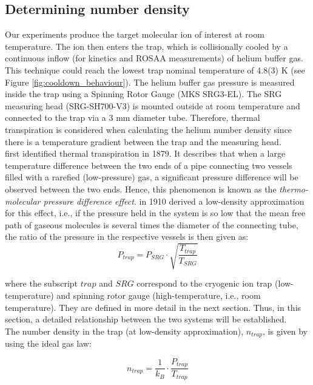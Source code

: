 \subsection{Determining number density}
\label{subsec:numer-density}

Our experiments produce the target molecular ion of interest at room
temperature. The ion then enters the trap, which is collisionally cooled by a continuous
inflow (for kinetics and ROSAA measurements) of helium buffer gas. This
technique could reach the lowest trap nominal temperature of 4.8(3) K (see
Figure \ref{fig:cooldown_behaviour}). The helium buffer gas pressure is
measured inside the trap using a Spinning Rotor Gauge (MKS SRG3-EL). The SRG
measuring head (SRG-SH700-V3) is mounted outside at room temperature and
connected to the trap via a 3 mm diameter tube. Therefore, thermal
transpiration is considered when calculating the helium number density since
there is a temperature gradient between the trap and the measuring head.\\

\citet{reynolds_xviii_1879} first identified thermal transpiration in 1879. It describes that when a large temperature difference between the two ends of a pipe connecting two vessels filled with a rarefied (low-pressure) gas, a significant pressure difference will be observed between the two ends. Hence, this phenomenon is known as the \textit{thermo-molecular pressure difference effect}. \citet{knudsen_thermischer_1910} in 1910 derived a low-density approximation for this effect, i.e., if the pressure held in the system is so low that the mean free path of gaseous molecules is several times the diameter of the connecting tube, the ratio of the pressure in the respective vessels is then given as:
\begin{equation}
    P_{trap} = P_{SRG} \cdot \sqrt{\frac{T_{trap}}{T_{SRG}}}
    \label{eqn:knudsen}
\end{equation}

where the subscript $trap$ and $SRG$ correspond to the cryogenic ion trap
(low-temperature) and spinning rotor gauge (high-temperature, i.e., room
temperature). They are defined in more detail in the next section. Thus, in
this section, a detailed relationship between the two systems will be
established.\\

The number density in the trap (at low-density approximation), $n_{trap}$, is
given by using the ideal gas law:

\begin{equation}
    n_{trap} = \frac{1}{k_B} \cdot \frac{P_{trap}}{T_{trap}}
    \label{eqn:ideal-gas-law}
\end{equation}

